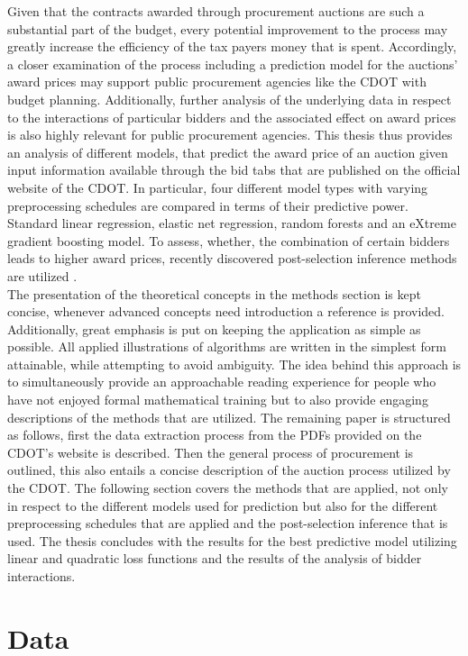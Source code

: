 \documentclass[a4paper,12pt, headsepline]{scrartcl}
\numberwithin{equation}{section}
\begin{document}
Given that the contracts awarded through procurement auctions are such a substantial part of the budget, every potential improvement to the process may greatly increase the efficiency of the tax payers money that is spent. Accordingly, a closer examination of the process including a prediction model for the auctions' award prices may support public procurement agencies like the CDOT with budget planning. Additionally, further analysis of the underlying data in respect to the interactions of particular bidders and the associated effect on award prices is also highly relevant for public procurement agencies. This thesis thus provides an analysis of different models, that predict the award price of an auction given input information available through the bid tabs that are published on the official website of the CDOT. In particular, four different model types with varying preprocessing schedules are compared in terms of their predictive power. Standard linear regression, elastic net regression, random forests and an eXtreme gradient boosting model. To assess, whether, the combination of certain bidders leads to higher award prices, recently discovered post-selection inference methods are utilized \citep{selectiveInference}.\\
The presentation of the theoretical concepts in the methods section is kept concise, whenever advanced concepts need introduction a reference is provided. Additionally, great emphasis is put on keeping the application as simple as possible. All applied illustrations of algorithms are written in the simplest form attainable, while attempting to avoid ambiguity. The idea behind this approach is to simultaneously provide an approachable reading experience for people who have not enjoyed formal mathematical training but to also provide engaging descriptions of the methods that are utilized.
The remaining paper is structured as follows, first the data extraction process from the PDFs provided on the CDOT's website is described. Then the general process of procurement is outlined, this also entails a concise description of the auction process utilized by the CDOT. The following section covers the methods that are applied, not only in respect to the different models used for prediction but also for the different preprocessing schedules that are applied and the post-selection inference that is used. The thesis concludes with the results for the best predictive model utilizing linear and quadratic loss functions and the results of the analysis of bidder interactions.
\newpage
\section{Data}\label{sec:data}
\end{document}
